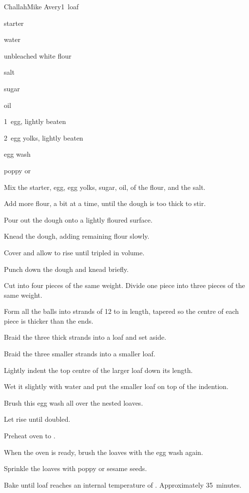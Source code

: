 \begin{recipe}{Challah}{Mike Avery}{1~loaf}

\begin{ingredients}
\item {} starter
\item {} water
\item {} unbleached white flour
\item {} salt
\item {} sugar
\item {} oil
\item 1~egg, lightly beaten
\item 2~egg yolks, lightly beaten
\item egg wash
\item poppy or 
\end{ingredients}

\begin{directions}
\item Mix the starter, egg, egg yolks, sugar, oil, \half{} of the flour, and the salt.
\item Add more flour, a bit at a time, until the dough is too thick to stir.
\item Pour out the dough onto a lightly floured surface.
\item Knead the dough, adding remaining flour slowly.
\item Cover and allow to rise until tripled in volume.
\item Punch down the dough and knead briefly.
\item Cut into four pieces of the same weight. Divide one piece into three pieces of the same weight.
\item Form all the balls into strands of 12 to  in length, tapered so the centre of each piece is thicker than the ends.
\item Braid the three thick strands into a loaf and set aside.
\item Braid the three smaller strands into a smaller loaf.
\item Lightly indent the top centre of the larger loaf down its length.
\item Wet it slightly with water and put the smaller loaf on top of the indention.
\item Brush this egg wash all over the nested loaves.
\item Let rise until doubled.
\item Preheat oven to .
\item When the oven is ready, brush the loaves with the egg wash again.
\item Sprinkle the loaves with poppy or sesame seeds.
\item Bake until loaf reaches an internal temperature of . Approximately 35~minutes.
\end{directions}

\end{recipe}
